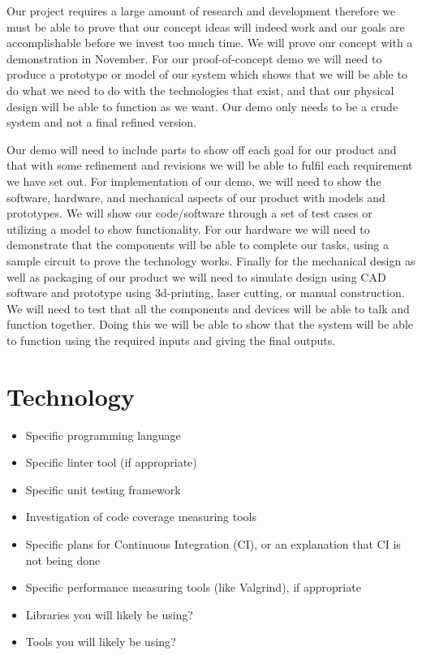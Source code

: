 \documentclass{article}
\begin{document}
	Our project requires a large amount of research and development therefore we must be able to prove that our concept ideas will indeed work and our goals are accomplishable before we invest too much time. We will prove our concept with a demonstration in November. For our proof-of-concept demo we will need to produce a prototype or model of our system which shows that we will be able to do what we need to do with the technologies that exist, and that our physical design will be able to function as we want. Our demo only needs to be a crude system and not a final refined version.  

	Our demo will need to include parts to show off each goal for our product and that with some refinement and revisions we will be able to fulfil each requirement we have set out. For implementation of our demo, we will need to show the software, hardware, and mechanical aspects of our product with models and prototypes. We will show our code/software through a set of test cases or utilizing a model to show functionality. For our hardware we will need to demonstrate that the components will be able to complete our tasks, using a sample circuit to prove the technology works. Finally for the mechanical design as well as packaging of our product we will need to simulate design using CAD software and prototype using 3d-printing, laser cutting, or manual construction. We will need to test that all the components and devices will be able to talk and function together. Doing this we will be able to show that the system will be able to function using the required inputs and giving the final outputs.

\section{Technology}

\begin{itemize}
\item Specific programming language
\item Specific linter tool (if appropriate)
\item Specific unit testing framework
\item Investigation of code coverage measuring tools
\item Specific plans for Continuous Integration (CI), or an explanation that CI
  is not being done
\item Specific performance measuring tools (like Valgrind), if
  appropriate
\item Libraries you will likely be using?
\item Tools you will likely be using?
\end{itemize}
\end{document}

